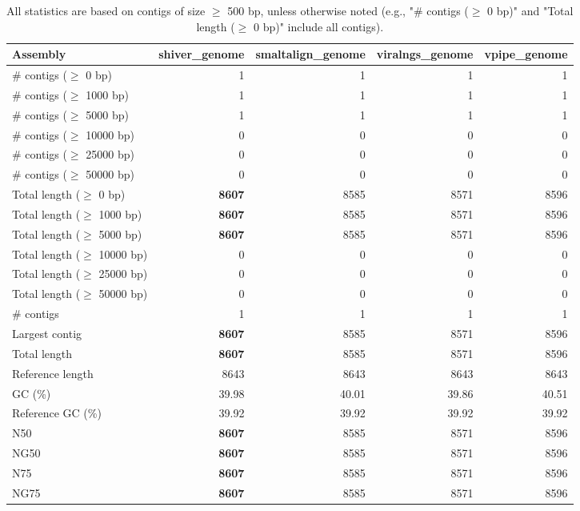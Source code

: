 \documentclass[12pt,a4paper]{article}
\begin{document}
\begin{table}[ht]
\begin{center}
\caption{All statistics are based on contigs of size $\geq$ 500 bp, unless otherwise noted (e.g., "\# contigs ($\geq$ 0 bp)" and "Total length ($\geq$ 0 bp)" include all contigs).}
\begin{tabular}{|l*{4}{|r}|}
\hline
Assembly & shiver\_genome & smaltalign\_genome & viralngs\_genome & vpipe\_genome \\ \hline
\# contigs ($\geq$ 0 bp) & 1 & 1 & 1 & 1 \\ \hline
\# contigs ($\geq$ 1000 bp) & 1 & 1 & 1 & 1 \\ \hline
\# contigs ($\geq$ 5000 bp) & 1 & 1 & 1 & 1 \\ \hline
\# contigs ($\geq$ 10000 bp) & 0 & 0 & 0 & 0 \\ \hline
\# contigs ($\geq$ 25000 bp) & 0 & 0 & 0 & 0 \\ \hline
\# contigs ($\geq$ 50000 bp) & 0 & 0 & 0 & 0 \\ \hline
Total length ($\geq$ 0 bp) & {\bf 8607} & 8585 & 8571 & 8596 \\ \hline
Total length ($\geq$ 1000 bp) & {\bf 8607} & 8585 & 8571 & 8596 \\ \hline
Total length ($\geq$ 5000 bp) & {\bf 8607} & 8585 & 8571 & 8596 \\ \hline
Total length ($\geq$ 10000 bp) & 0 & 0 & 0 & 0 \\ \hline
Total length ($\geq$ 25000 bp) & 0 & 0 & 0 & 0 \\ \hline
Total length ($\geq$ 50000 bp) & 0 & 0 & 0 & 0 \\ \hline
\# contigs & 1 & 1 & 1 & 1 \\ \hline
Largest contig & {\bf 8607} & 8585 & 8571 & 8596 \\ \hline
Total length & {\bf 8607} & 8585 & 8571 & 8596 \\ \hline
Reference length & 8643 & 8643 & 8643 & 8643 \\ \hline
GC (\%) & 39.98 & 40.01 & 39.86 & 40.51 \\ \hline
Reference GC (\%) & 39.92 & 39.92 & 39.92 & 39.92 \\ \hline
N50 & {\bf 8607} & 8585 & 8571 & 8596 \\ \hline
NG50 & {\bf 8607} & 8585 & 8571 & 8596 \\ \hline
N75 & {\bf 8607} & 8585 & 8571 & 8596 \\ \hline
NG75 & {\bf 8607} & 8585 & 8571 & 8596 \\ \hline

\end{tabular}
\end{center}
\end{table}
\end{document}
